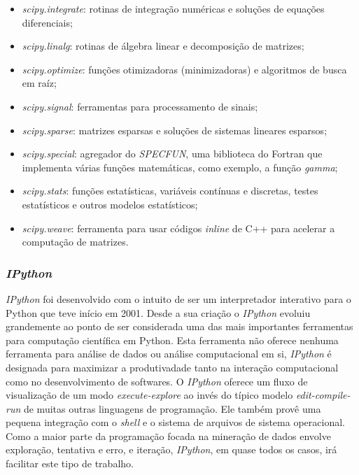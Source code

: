 \begin{itemize}
	\item \textit{scipy.integrate}: rotinas de integração numéricas e soluções de equações diferenciais;
	\item \textit{scipy.linalg}: rotinas de álgebra linear e decomposição de matrizes;
	\item \textit{scipy.optimize}: funções otimizadoras (minimizadoras) e algoritmos de busca em raíz;
	\item \textit{scipy.signal}: ferramentas para processamento de sinais;
	\item \textit{scipy.sparse}: matrizes esparsas e soluções de sistemas lineares esparsos;
	\item \textit{scipy.special}: agregador do \textit{SPECFUN}, uma biblioteca do Fortran que implementa várias funções matemáticas, como exemplo, a função \textit{gamma};
	\item \textit{scipy.stats}: funções estatísticas, variáveis contínuas e discretas, testes estatísticos e outros modelos estatísticos;
	\item \textit{scipy.weave}: ferramenta para usar códigos \textit{inline} de C++ para acelerar a computação de matrizes.
\end{itemize}


\subsubsection{\textit{IPython}}
\textit{IPython} foi desenvolvido com o intuito de ser um interpretador interativo para o Python que teve início em 2001. Desde a sua criação o \textit{IPython} evoluiu grandemente ao ponto de ser considerada uma das mais importantes ferramentas para computação científica em Python. Esta ferramenta não oferece nenhuma ferramenta para análise de dados ou análise computacional em si, \textit{IPython} é designada para maximizar a produtivadade tanto na interação computacional como no desenvolvimento de softwares. O \textit{IPython} oferece um fluxo de visualização de um modo \textit{execute-explore} ao invés do típico modelo \textit{edit-compile-run} de muitas outras linguagens de programação. Ele também provê uma pequena integração com o \textit{shell} e o sistema de arquivos de sistema operacional. Como a maior parte da programação focada na mineração de dados envolve exploração, tentativa e erro, e iteração, \textit{IPython}, em quase todos os casos, irá facilitar este tipo de trabalho. \cite{python-analysis}

